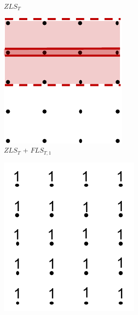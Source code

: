 \begin{figure}[!t]
\begin{subfigure}{0.18\linewidth}
\caption{$ZLS_{T}$}
\label{}
\end{subfigure}
\hspace{2mm}
\begin{subfigure}{0.18\linewidth}
\includegraphics[width=\linewidth]{Images/zlsT_flsT.pdf}
\caption{$ZLS_{T}$ + $FLS_{T,1}$}
\label{}
\end{subfigure}
\begin{subfigure}{0.18\linewidth}
\includegraphics[width=\linewidth]{Images/sd.pdf}

\end{subfigure}
\end{figure}

